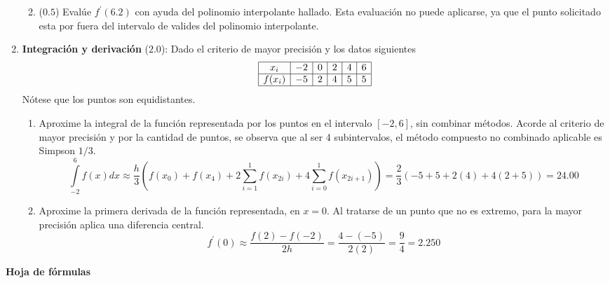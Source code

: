 \documentclass[12pt]{article}
\begin{document}
\begin{enumerate}[leftmargin=*,widest=9]
\begin{enumerate}[label=\alph*]
\[    \]
    \item ($0.5$) Evalúe \(f^\prime(6.2)\) con ayuda del polinomio interpolante hallado.
Esta evaluación no puede aplicarse, ya que el punto solicitado esta por fuera del intervalo de valides del polinomio interpolante.
    \end{enumerate}
    \item \textbf{Integración y derivación} ($2.0$): Dado el criterio de mayor precisión y los datos siguientes
    \[
    \begin{array}{|c|c|c|c|c|c|}
    \hline
    x_i & -2 & 0 & 2 & 4 & 6 \\
    \hline
    f(x_i) & -5 & 2 & 4 & 5 & 5\\
    \hline
    \end{array}
    \]
    Nótese que los puntos son equidistantes.
    \begin{enumerate}[label=\alph*]
    \item  Aproxime la integral de la función representada por los puntos en el intervalo \(\left[-2, 6\right]\), sin combinar métodos.
    Acorde al criterio de mayor precisión y por la cantidad de puntos, se observa que al ser 4 subintervalos, el método compuesto no combinado aplicable es Simpson \(1/3\).
    \[
    \int\limits_{-2}^6 f(x)dx \approx \frac{h}{3}\left( f(x_0) + f(x_4) + 2\sum\limits_{i=1}^{1}f(x_{2i}) + 4\sum\limits_{i=0}^{1}f(x_{2i+1}) \right) = \frac{2}{3}(-5 + 5 + 2(4) + 4 ( 2 + 5)) = 24.00
    \]
    \item Aproxime la primera derivada de la función representada, en \(x = 0\).
    Al tratarse de un punto que no es extremo, para la mayor precisión aplica una diferencia central.
    \[
    f^\prime(0) \approx \frac{f(2) - f(-2)}{2h} = \frac{4-(-5)}{2(2)} = \frac{9}{4} = 2.250
    \]
    \end{enumerate}
  \end{enumerate}
\begin{center}
\textbf{Hoja de fórmulas}
\end{center}
\end{document}
